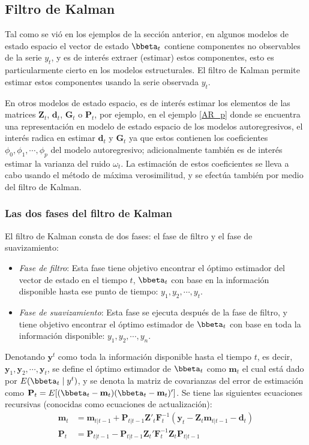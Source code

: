 \subsection{Filtro de Kalman}
Tal como se vió en los ejemplos de la sección anterior, en algunos modelos de estado espacio el vector de estado $\bbeta_t$ contiene componentes no observables de la serie $y_t$, y es de interés extraer (estimar) estos componentes, esto es particularmente cierto en los modelos estructurales. El filtro de Kalman permite estimar estos componentes usando la serie observada $y_t$.

En otros modelos de estado espacio, es de interés estimar los elementos de las matrices $\mathbf{Z}_t$, $\mathbf{d}_t$, $\mathbf{G}_t$ o $\mathbf{P}_t$, por ejemplo, en el ejemplo \ref{AR_p} donde se encuentra una representación en modelo de estado espacio de los modelos autoregresivos, el interés radica en estimar $\mathbf{d}_t$ y $\mathbf{G}_t$ ya que estos contienen los coeficientes $\phi_0,\phi_1,\cdots,\phi_p$ del modelo autoregresivo; adicionalmente también es de interés estimar la varianza del ruido $\omega_t$. La estimación de estos coeficientes se lleva a cabo usando el método de máxima verosimilitud, y se efectúa también por medio del filtro de Kalman.

\subsubsection{Las dos fases del filtro de Kalman}
El filtro de Kalman consta de dos fases: el fase de filtro y el fase de suavizamiento:
\begin{itemize}
\item \emph{Fase de filtro}: Esta fase tiene objetivo encontrar el óptimo estimador del vector de estado en el tiempo $t$, $\bbeta_t$ con base en la información disponible hasta ese punto de tiempo: $y_1,y_2,\cdots,y_t$.
\item \emph{Fase de suavizamiento}: Esta fase se ejecuta después de la fase de filtro, y tiene objetivo encontrar el óptimo estimador de $\bbeta_t$ con base en toda la información disponible: $y_1,y_2,\cdots,y_n$.
\end{itemize}

Denotando $\mathbf{y}^t$ como toda la información disponible hasta el tiempo $t$, es decir, $\mathbf{y}_1,\mathbf{y}_2,\cdots,\mathbf{y}_t$, se define el óptimo estimador de $\bbeta_t$ como $\mathbf{m}_t$ el cual está dado por $E(\bbeta_t\mid y^t)$, y se denota la matriz de covarianzas del error de estimación como $\mathbf{P}_t=E[(\bbeta_t-\mathbf{m}_t)(\bbeta_t-\mathbf{m}_t)']$. Se tiene las siguientes ecuaciones recursivas (conocidas como ecuaciones de actualización):
\begin{align}
\mathbf{m}_t&=\mathbf{m}_{t|t-1}+\mathbf{P}_{t|t-1}\mathbf{Z}'_t\mathbf{F}^{-1}_t(\mathbf{y}_t-\mathbf{Z}_t\mathbf{m}_{t|t-1}-\mathbf{d}_t)\label{actua_1}\\
\mathbf{P}_t&=\mathbf{P}_{t|t-1}-\mathbf{P}_{t|t-1}\mathbf{Z}_t'\mathbf{F}_t^{-1}\mathbf{Z}_t\mathbf{P}_{t|t-1}\label{actua_2}
\end{align}

